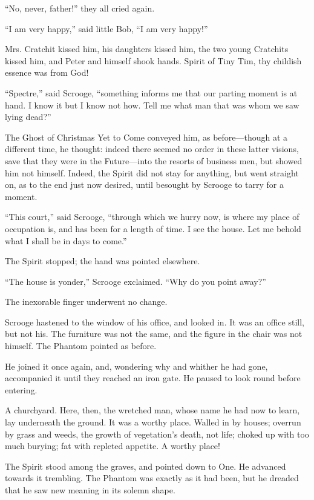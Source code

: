 \documentclass[paper=a5,BCOR=15mm,twoside,DIV=15,headinclude=off,12pt,chapterprefix=off,openany,headings=huge]{scrbook} %
\begin{document}
\enquote{No, never, father!} they all cried again.

\enquote{I am very happy,} said little Bob, \enquote{I am very happy!}

Mrs. Cratchit kissed him, his daughters kissed him, the two young Cratchits kissed him, and Peter and himself shook hands. Spirit of Tiny Tim, thy childish essence was from God!

\enquote{Spectre,} said Scrooge, \enquote{something informs me that our parting moment is at hand. I know it but I know not how. Tell me what man that was whom we saw lying dead?}

The Ghost of Christmas Yet to Come conveyed him, as before—though at a different time, he thought: indeed there seemed no order in these latter visions, save that they were in the Future—into the resorts of business men, but showed him not himself. Indeed, the Spirit did not stay for anything, but went straight on, as to the end just now desired, until besought by Scrooge to tarry for a moment.

\enquote{This court,} said Scrooge, \enquote{through which we hurry now, is where my place of occupation is, and has been for a length of time. I see the house. Let me behold what I shall be in days to come.}

The Spirit stopped; the hand was pointed elsewhere.

\enquote{The house is yonder,} Scrooge exclaimed. \enquote{Why do you point away?}

The inexorable finger underwent no change.

Scrooge hastened to the window of his office, and looked in. It was an office still, but not his. The furniture was not the same, and the figure in the chair was not himself. The Phantom pointed as before.

He joined it once again, and, wondering why and whither he had gone, accompanied it until they reached an iron gate. He paused to look round before entering.

A churchyard. Here, then, the wretched man, whose name he had now to learn, lay underneath the ground. It was a worthy place. Walled in by houses; overrun by grass and weeds, the growth of vegetation's death, not life; choked up with too much burying; fat with repleted appetite. A worthy place!

The Spirit stood among the graves, and pointed down to One. He advanced towards it trembling. The Phantom was exactly as it had been, but he dreaded that he saw new meaning in its solemn shape.
\end{document}
